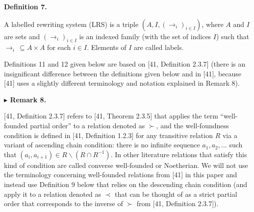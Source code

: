 \documentclass[10pt,a4paper]{amsart}
\begin{document}
 
  
 
 
 
\par\medskip\noindent\textbf{Definition 7.}\par
 
 
A labelled rewriting system (LRS) is a triple $(A,I,(\to_{i})_{i\in I})$, where $A$ and $I$ are sets and $(\to_{i})_{i\in I}$ is an indexed family (with the set of indices $I$) such that $\to_{i}\,\subseteq A\times A$ for each $i\in I$. Elements of $I$ are called labels.\par
 
 
 
 
Definitions 11 and 12 given below are based on [41, Definition 2.3.7] (there is an insignificant difference between the definitions given below and in [41], because [41] uses a slightly different terminology and notation explained in Remark 8).\par
 
 
 
\par\medskip\noindent\textbf{$\blacktriangleright$ Remark 8.}\par
 
 
[41, Definition 2.3.7] refers to [41, Theorem 2.3.5] that applies the term “well-founded partial order” to a relation denoted as $\succ$, and the well-foundness condition is defined in [41, Definition 1.2.3] for any transitive relation $R$ via a variant of ascending chain condition: there is no infinite sequence $a_{1},a_{2},...$ such that $(a_{i},a_{i+1})\in R\backslash(R\cap R^{-1})$. In other literature relations that satisfy this kind of condition are called converse well-founded or Noetherian. We will not use the terminology concerning well-founded relations from [41] in this paper and instead use Definition 9 below that relies on the descending chain condition (and apply it to a relation denoted as $\prec$ that can be thought of as a strict partial order that corresponds to the inverse of $\succ$ from [41, Definition 2.3.7]).\par
 
\end{document}
